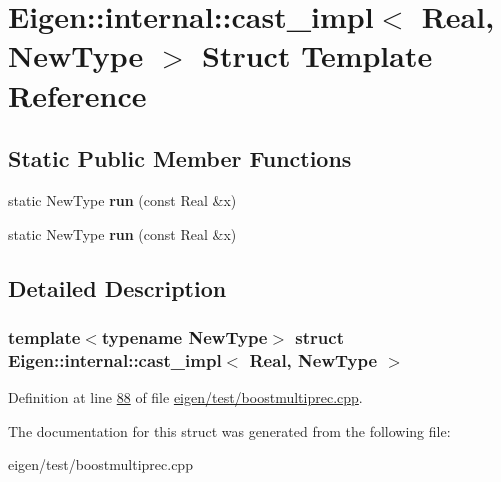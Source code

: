 \hypertarget{struct_eigen_1_1internal_1_1cast__impl_3_01_real_00_01_new_type_01_4}{}\section{Eigen\+:\+:internal\+:\+:cast\+\_\+impl$<$ Real, New\+Type $>$ Struct Template Reference}
\label{struct_eigen_1_1internal_1_1cast__impl_3_01_real_00_01_new_type_01_4}
\subsection*{Static Public Member Functions}
\begin{DoxyCompactItemize}
\item 
\mbox{\label{struct_eigen_1_1internal_1_1cast__impl_3_01_real_00_01_new_type_01_4_aa6d79a4e6be01f308d1ab0b95b4f8dab}} 
static New\+Type {\bfseries run} (const Real \&x)
\item 
\mbox{\label{struct_eigen_1_1internal_1_1cast__impl_3_01_real_00_01_new_type_01_4_aa6d79a4e6be01f308d1ab0b95b4f8dab}} 
static New\+Type {\bfseries run} (const Real \&x)
\end{DoxyCompactItemize}


\subsection{Detailed Description}
\subsubsection*{template$<$typename New\+Type$>$\newline
struct Eigen\+::internal\+::cast\+\_\+impl$<$ Real, New\+Type $>$}



Definition at line \hyperlink{eigen_2test_2boostmultiprec_8cpp_source_l00088}{88} of file \hyperlink{eigen_2test_2boostmultiprec_8cpp_source}{eigen/test/boostmultiprec.\+cpp}.



The documentation for this struct was generated from the following file\+:\begin{DoxyCompactItemize}
\item 
eigen/test/boostmultiprec.\+cpp\end{DoxyCompactItemize}
